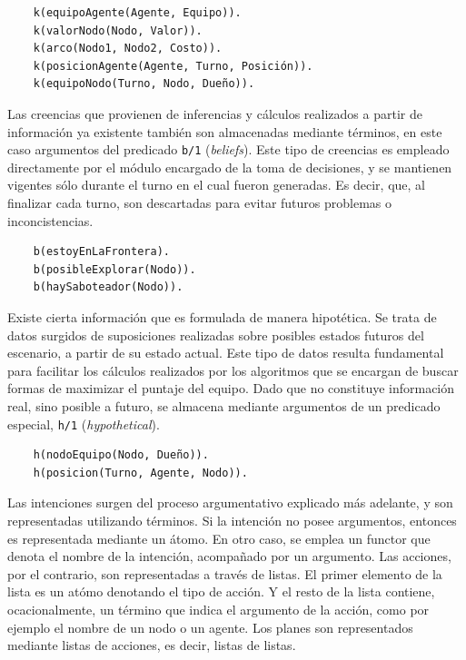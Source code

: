 \documentclass[oneside]{book}
\theoremstyle{definition}
\theoremstyle{example}
\begin{document}
\begin{verbatim}    
    k(equipoAgente(Agente, Equipo)).
    k(valorNodo(Nodo, Valor)).
    k(arco(Nodo1, Nodo2, Costo)).
    k(posicionAgente(Agente, Turno, Posición)).
    k(equipoNodo(Turno, Nodo, Dueño)).    
\end{verbatim}

Las creencias que provienen de inferencias y cálculos realizados a partir de información 
ya existente también son almacenadas mediante términos, en este caso argumentos del 
predicado \texttt{b/1} (\textit{beliefs}). Este tipo de creencias es empleado directamente 
por el módulo encargado de la toma de decisiones, y se mantienen vigentes sólo durante el 
turno en el cual fueron generadas. Es decir, que, al finalizar cada turno, son descartadas 
para evitar futuros problemas o inconcistencias.

\begin{verbatim}
    b(estoyEnLaFrontera).
    b(posibleExplorar(Nodo)).
    b(haySaboteador(Nodo)).
\end{verbatim}

Existe cierta información que es formulada de manera hipotética. Se trata de datos 
surgidos de suposiciones realizadas sobre posibles estados futuros del escenario, a partir 
de su estado actual. Este tipo de datos resulta fundamental para facilitar los cálculos 
realizados por los algoritmos que se encargan de buscar formas de maximizar el puntaje 
del equipo. Dado que no constituye información real, sino posible a futuro, se almacena 
mediante argumentos de un predicado especial, \texttt{h/1} (\textit{hypothetical}).

\begin{verbatim}
    h(nodoEquipo(Nodo, Dueño)).
    h(posicion(Turno, Agente, Nodo)).    
\end{verbatim}

Las intenciones surgen del proceso argumentativo explicado más adelante, y son 
representadas utilizando términos. Si la intención no posee argumentos, entonces es 
representada mediante un átomo. En otro caso, se emplea un functor que denota el 
nombre de la intención, acompañado por un argumento. Las acciones, por el contrario, 
son representadas a través de listas. El primer elemento de la lista es un atómo denotando 
el tipo de acción. Y el resto de la lista contiene, ocacionalmente, un término que 
indica el argumento de la acción, como por ejemplo el nombre de un nodo o un agente.
Los planes son representados mediante listas de acciones, es decir, listas de listas.
\end{document}
